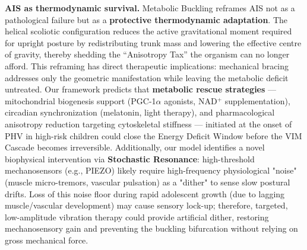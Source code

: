 \documentclass[12pt]{article}
\begin{document}
\textbf{AIS as thermodynamic survival.} Metabolic Buckling reframes AIS not as a pathological failure but as a \textbf{protective thermodynamic adaptation}. The helical scoliotic configuration reduces the active gravitational moment required for upright posture by redistributing trunk mass and lowering the effective centre of gravity, thereby shedding the ``Anisotropy Tax'' the organism can no longer afford. This reframing has direct therapeutic implications: mechanical bracing addresses only the geometric manifestation while leaving the metabolic deficit untreated. Our framework predicts that \textbf{metabolic rescue strategies} --- mitochondrial biogenesis support (PGC-1$\alpha$ agonists, NAD$^+$ supplementation), circadian synchronization (melatonin, light therapy), and pharmacological anisotropy reduction targeting cytoskeletal stiffness --- initiated at the onset of PHV in high-risk children could close the Energy Deficit Window before the VIM Cascade becomes irreversible. Additionally, our model identifies a novel biophysical intervention via \textbf{Stochastic Resonance}: high-threshold mechanosensors (e.g., PIEZO) likely require high-frequency physiological "noise" (muscle micro-tremors, vascular pulsation) as a "dither" to sense slow postural drifts. Loss of this noise floor during rapid adolescent growth (due to lagging muscle/vascular development) may cause sensory lock-up; therefore, targeted, low-amplitude vibration therapy could provide artificial dither, restoring mechanosensory gain and preventing the buckling bifurcation without relying on gross mechanical force.
\end{document}
